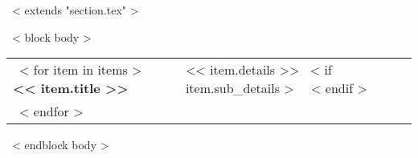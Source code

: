 ~< extends "section.tex" >~

~< block body >~
\begin{tabular}{p{1in}p{5in}}
  ~< for item in items >~
    \textbf{<< item.title >>} & << item.details >>
    ~< if item.sub_details >~
    \scriptsize{
      \color{gray}{<< item.sub_details >>}
    }
    ~< endif >~ \\
  ~< endfor >~
\end{tabular}
~< endblock body >~
